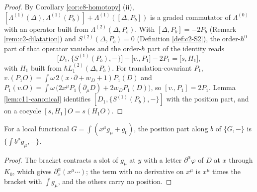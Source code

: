 \begin{proof}
By Corollary \ref{cor:c8-homotopy} (ii), $[\Lambda^{(1)}(\Delta),\Lambda^{(1)}(P_b)]+\Lambda^{(1)}([\Delta,P_b])$ is a graded commutator of $\Lambda^{(0)}$ with an operator built from $\Lambda^{(2)}(\Delta,P_b)$. With $[\Delta,P_b]=-2P_b$ (Remark \ref{rem:c2-dilatation}) and $S^{(2)}(\Delta,P_b)=0$ (Definition \ref{def:c2-S2}), the order-$\hbar^0$ part of that operator vanishes and the order-$\hbar$ part of the identity reads
\[
\big[D_1,\{S^{(1)}(P_b),-\}\big]+\big[v.,P_1\big]-2P_1=\big[s,H_1\big],
\]
with $H_1$ built from $\hbar L_1^{(2)}(\Delta,P_b)$. For translation-covariant $P_1$, $v.(P_1O)=\int\omega\,2(x\cdot\partial+w_D+1)P_1(D)$ and $P_1(v.O)=\int\omega\,\big(2x^\mu P_1(\partial_\mu D)+2w_DP_1(D)\big)$, so $[v.,P_1]=2P_1$. Lemma \ref{lem:c11-canonical} identifies $[D_1,\{S^{(1)}(P_b),-\}]$ with the position part, and on a cocycle $[s,H_1]O=s(H_1O)$.
\end{proof}

\begin{lemma}
\label{lem:c11-bracketpos}
For a local functional $G=\int(x^\mu g_\mu+g_0)$, the position part along $b$ of $\{G,-\}$ is $\{\int b^\mu g_\mu,-\}$.
\end{lemma}

\begin{proof}
The bracket contracts a slot of $g_\mu$ at $y$ with a letter $\partial^\alpha\varphi$ of $D$ at $x$ through $K_0$, which gives $\partial^\alpha_x(x^\mu\cdots)$; the term with no derivative on $x^\mu$ is $x^\mu$ times the bracket with $\int g_\mu$, and the others carry no position.
\end{proof}

